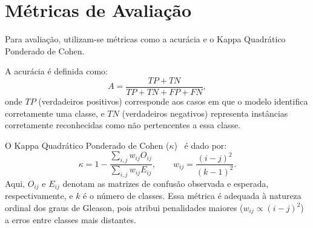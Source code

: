 \section{Métricas de Avaliação}

Para avaliação, utilizam-se métricas como a acurácia e o Kappa Quadrático Ponderado de Cohen.

A acurácia é definida como:
\[
A = \frac{TP + TN}{TP + TN + FP + FN},
\]
onde $TP$ (verdadeiros positivos) corresponde aos casos em que o modelo identifica corretamente uma classe, e $TN$ (verdadeiros negativos) representa instâncias corretamente reconhecidas como não pertencentes a essa classe.

O Kappa Quadrático Ponderado de Cohen ($\kappa$)~\cite{ref-cohen1968} é dado por:
\[
\kappa = 1 - \frac{\sum_{i,j} w_{ij} O_{ij}}{\sum_{i,j} w_{ij} E_{ij}},
\qquad
w_{ij} = \frac{(i-j)^2}{(k-1)^2}.
\]
Aqui, $O_{ij}$ e $E_{ij}$ denotam as matrizes de confusão observada e esperada, respectivamente, e $k$ é o número de classes. Essa métrica é adequada à natureza ordinal dos graus de Gleason, pois atribui penalidades maiores ($w_{ij} \propto (i-j)^2$) a erros entre classes mais distantes.